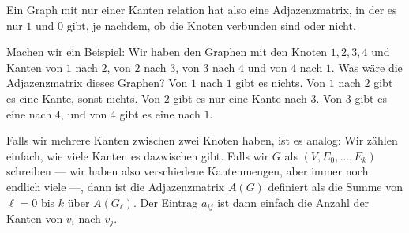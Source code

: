 \begin{spoken-clean}[00:28:30 - 00:31:12]
Ein Graph mit nur einer Kanten relation hat also eine Adjazenzmatrix, in der es nur $1$ und $0$ gibt, je nachdem, ob die Knoten verbunden sind oder nicht.

Machen wir ein Beispiel: Wir haben den Graphen mit den Knoten $1, 2, 3, 4$ und Kanten von $1$ nach $2$, von $2$ nach $3$, von $3$ nach $4$ und von $4$ nach $1$. Was wäre die Adjazenzmatrix dieses Graphen? Von $1$ nach $1$ gibt es nichts. Von $1$ nach $2$ gibt es eine Kante, sonst nichts. Von $2$ gibt es nur eine Kante nach $3$. Von $3$ gibt es eine nach $4$, und von $4$ gibt es eine nach $1$.

Falls wir mehrere Kanten zwischen zwei Knoten haben, ist es analog: Wir zählen einfach, wie viele Kanten es dazwischen gibt. Falls wir $G$ als $(V, E_0, \dots, E_k)$ schreiben --- wir haben also verschiedene Kantenmengen, aber immer noch endlich viele ---, dann ist die Adjazenzmatrix $A(G)$ definiert als die Summe von $\ell = 0$ bis $k$ über $A(G_\ell)$. Der Eintrag $a_{ij}$ ist dann einfach die Anzahl der Kanten von $v_i$ nach $v_j$.
\end{spoken-clean}

